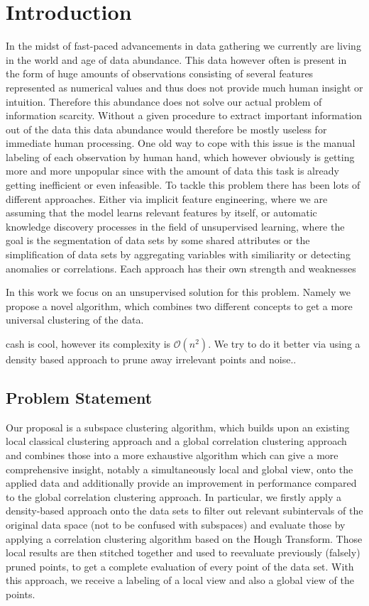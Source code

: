 \chapter{Introduction}

In the midst of fast-paced advancements in data gathering we currently are living in the world and age of data abundance. This data however often is present in the form of huge amounts of observations consisting of several features represented as numerical values and thus does not provide much human insight or intuition. Therefore this abundance does not solve our actual problem of information scarcity. Without a given procedure to extract important information out of the data this data abundance would therefore be mostly useless for immediate human processing. One old way to cope with this issue is the manual labeling of each observation by human hand, which however obviously is getting more and more unpopular since with the amount of data this task is already getting inefficient or even infeasible. %
To tackle this problem there has been lots of different approaches. Either via implicit feature engineering, where we are assuming that the model learns relevant features by itself, or automatic knowledge discovery processes in the field of unsupervised learning, where the goal is  the segmentation of data sets by some shared attributes or the simplification of data sets by aggregating variables with similiarity or detecting anomalies or correlations. Each approach has their own strength and weaknesses

In this work we focus on an unsupervised solution for this problem. Namely we propose a novel algorithm, which combines two different concepts to get a more universal clustering of the data.

\acrfull{cash} is cool, however its complexity is $\mathcal{O}(n^2)$.
We try to do it better via using a density based approach to prune away irrelevant points and noise..

\section{Problem Statement}
Our proposal is a subspace clustering algorithm, which builds upon an existing local classical clustering approach and a global correlation clustering approach and combines those into a more exhaustive algorithm which can give a more comprehensive insight, notably a simultaneously local and global view, onto the applied data and additionally provide an improvement in performance compared to the global correlation clustering approach. In particular, we firstly apply a density-based approach onto the data sets to filter out relevant subintervals of the original data space (not to be confused with subspaces) and evaluate those by applying a correlation clustering algorithm based on the Hough Transform. Those local results are then stitched together and used to reevaluate previously (falsely) pruned points, to get a complete evaluation of every point of the data set. With this approach, we receive a labeling of a local view and also a global view of the points. 

